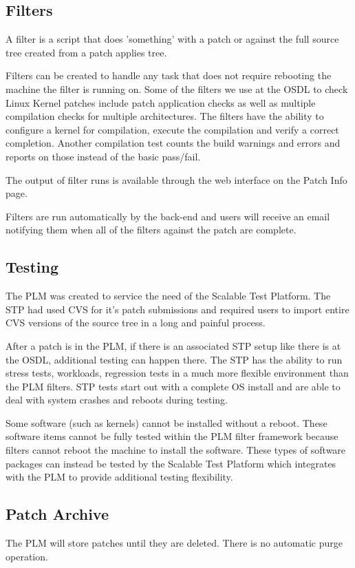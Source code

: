 \subsection{Filters}
A filter is a script that does 'something' with a patch or against the 
full source tree created from a patch applies tree.  

Filters can be created to handle any task that does not require rebooting the 
machine the filter is running on.  Some of the filters we use at the OSDL to
check Linux Kernel patches include patch application checks as well as 
multiple compilation checks for multiple architectures.  The filters have the
ability to configure a kernel for compilation, execute the compilation and
verify a correct completion.  Another compilation test counts the build warnings 
and errors and reports on those instead of the basic pass/fail.

The output of filter runs is available through the web interface on the Patch
Info page.

Filters are run automatically by the back-end and users will receive an email 
notifying them when all of the filters against the patch are complete.

\subsection{Testing}
The PLM was created to service the need of the Scalable Test Platform.  The STP
had used CVS for it's patch submissions and required users to import entire CVS
versions of the source tree in a long and painful process.

After a patch is in the PLM, if there is an associated STP setup like there is
at the OSDL, additional testing can happen there.  The STP has the ability to 
run stress tests, workloads, regression tests in a much more flexible environment 
than the PLM filters.  STP tests start out with a complete OS install and are able
to deal with system crashes and reboots during testing.

Some software (such as kernels) cannot be installed without a reboot.  These 
software items cannot be fully tested within the PLM filter framework because 
filters cannot reboot the machine to install the software.  These types of software
packages can instead be tested by the Scalable Test Platform which integrates with
the PLM to provide additional testing flexibility.

\subsection{Patch Archive}
The PLM will store patches until they are deleted.  There is no automatic purge operation.

